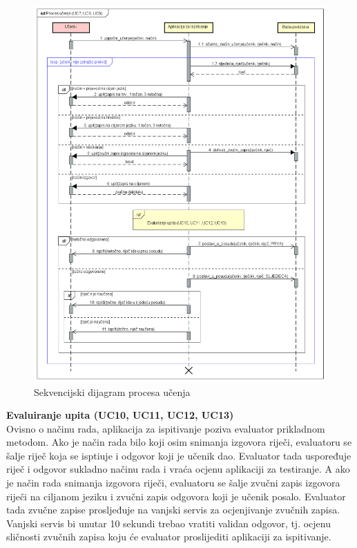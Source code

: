 					\begin{figure}[H]
						\includegraphics[width=\textwidth]{dijagrami/SD_ProcesUcenja.png} %
						\caption{Sekvencijski dijagram procesa učenja}
						\label{fig:SD_ProcesUcenja} %
					\end{figure}
				
				\textbf{Evaluiranje upita (UC10, UC11, UC12, UC13)}\\
				
					{Ovisno o načinu rada, aplikacija za ispitivanje poziva evaluator prikladnom metodom. Ako je način rada bilo koji osim snimanja izgovora riječi, evaluatoru se šalje riječ koja se isptiuje i odgovor koji je učenik dao. Evaluator tada uspoređuje riječ i odgovor sukladno načinu rada i vraća ocjenu aplikaciji za testiranje. A ako je način rada snimanja izgovora riječi, evaluatoru se šalje zvučni zapis izgovora riječi na ciljanom jeziku i zvučni zapis odgovora koji je učenik posalo. Evaluator tada zvučne zapise prosljeđuje na vanjski servis za ocjenjivanje zvučnih zapisa. Vanjski servis bi unutar 10 sekundi trebao vratiti validan odgovor, tj. ocjenu sličnosti zvučnih zapisa koju će evaluator proslijediti aplikaciji za ispitivanje.}
					\eject
				
